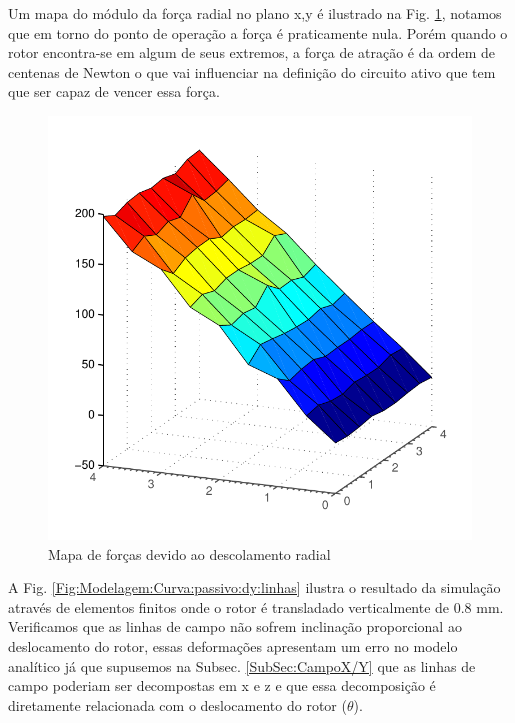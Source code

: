 Um mapa do módulo da força radial no plano x,y é ilustrado na Fig. \ref{fig:passivo_otimizado_fem_plano}, notamos que em torno do ponto de operação a força é praticamente nula. Porém quando o rotor encontra-se em algum de seus extremos, a força de atração é da ordem de centenas de Newton o que vai influenciar na definição do circuito ativo que tem que ser capaz de vencer essa força.

\begin{figure}[!ht]
\centering
\includegraphics[width=0.7\linewidth]{Figs/Simulacoes/Passivo2/passivo_otimizado_fem_plano}
\caption{Mapa de forças devido ao descolamento radial}
\label{fig:passivo_otimizado_fem_plano}
\end{figure}


A Fig. \ref{Fig:Modelagem:Curva:passivo:dy:linhas} ilustra o resultado da simulação através de elementos finitos onde o rotor é transladado verticalmente de 0.8 mm. Verificamos que as linhas de campo não sofrem inclinação proporcional ao deslocamento do rotor, essas deformações apresentam um erro no modelo analítico já que supusemos na Subsec. \ref{SubSec:CampoX/Y} que as linhas de campo poderiam ser decompostas em x e z e que essa decomposição é diretamente relacionada com o deslocamento do rotor ($\theta$). 

